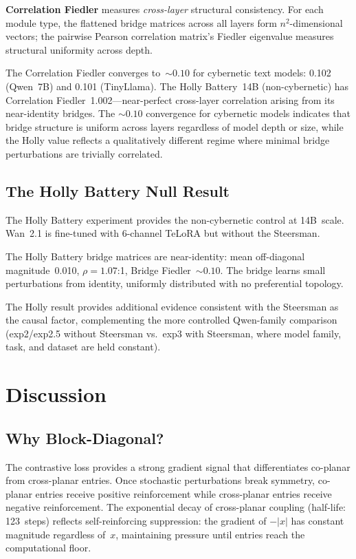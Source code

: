 \documentclass[11pt]{article}
\begin{document}
\textbf{Correlation Fiedler} measures \emph{cross-layer} structural
consistency. For each module type, the flattened bridge matrices
across all layers form $n^2$-dimensional vectors; the pairwise Pearson
correlation matrix's Fiedler eigenvalue measures structural
uniformity across depth.

The Correlation Fiedler converges to~${\sim}0.10$ for cybernetic text
models: 0.102 (Qwen~7B) and 0.101 (TinyLlama). The Holly Battery~14B
(non-cybernetic) has Correlation Fiedler~1.002---near-perfect
cross-layer correlation arising from its near-identity bridges. The
${\sim}0.10$ convergence for cybernetic models indicates that bridge
structure is uniform across layers regardless of model depth or size,
while the Holly value reflects a qualitatively different regime where
minimal bridge perturbations are trivially correlated.

\subsection{The Holly Battery Null Result}

The Holly Battery experiment provides the non-cybernetic control at
14B~scale. Wan~2.1 is fine-tuned with 6-channel TeLoRA but
without the Steersman.

The Holly Battery bridge matrices
are near-identity: mean off-diagonal magnitude~0.010,
$\rho = 1.07$:1, Bridge Fiedler~${\sim}0.10$. The bridge learns small
perturbations from identity, uniformly
distributed with no preferential topology.

The Holly result provides additional evidence consistent with the
Steersman as the causal factor, complementing the more controlled
Qwen-family comparison (exp2/exp2.5 without Steersman vs.\ exp3 with
Steersman, where model family, task, and dataset are held constant).


\section{Discussion}
\label{sec:discussion}

\subsection{Why Block-Diagonal?}

The contrastive loss provides a strong gradient signal that
differentiates co-planar from cross-planar entries. Once stochastic
perturbations break symmetry, co-planar entries receive positive
reinforcement while cross-planar entries receive negative
reinforcement. The exponential decay of cross-planar coupling
(half-life: 123~steps) reflects self-reinforcing suppression: the
gradient of $-|x|$ has constant magnitude regardless of~$x$,
maintaining pressure until entries reach the computational floor.
\end{document}
